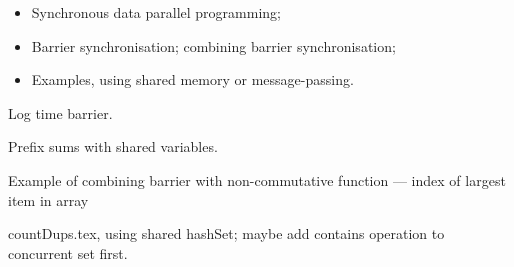 
\begin{slide}

\begin{itemize}
\item 
Synchronous data parallel programming;

\item
Barrier synchronisation; combining barrier synchronisation;

\item
Examples, using shared memory or message-passing.
\end{itemize}
\end{slide}


\exercises

Log time barrier.  %


Prefix sums with shared variables. %

Example of combining barrier with non-commutative function --- index of
largest item in array

 countDups.tex, using shared hashSet; maybe add contains operation to
 concurrent set first.
